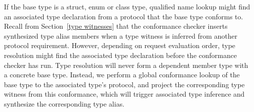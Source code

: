 \documentclass[../generics]{subfiles}
\begin{document}
If the base type is a struct, enum or class type, qualified name lookup might find an associated type declaration from a protocol that the base type conforms to. Recall from Section~\ref{type witnesses} that the conformance checker inserts synthesized type alias members when a type witness is inferred from another protocol requirement. However, depending on request evaluation order, type resolution might find the associated type declaration before the conformance checker has run. Type resolution will never form a dependent member type with a concrete base type. Instead, we perform a global conformance lookup of the base type to the associated type's protocol, and project the corresponding type witness from this conformance, which will trigger associated type inference and synthesize the corresponding type alias.
\end{document}
